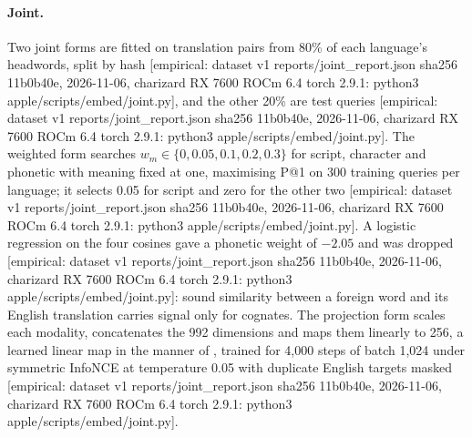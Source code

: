 \documentclass[11pt]{article}
\newcommand{\tg}[1]{\textcolor{bucketgray}{\footnotesize #1}}
\begin{document}
\paragraph{Joint.} Two joint forms are fitted on translation pairs from 80\% of each language's headwords, split by hash \tg{[empirical: dataset v1 reports/joint\_report.json sha256 11b0b40e, 2026-11-06, charizard RX 7600 ROCm 6.4 torch 2.9.1: python3 apple/scripts/embed/joint.py]}, and the other 20\% are test queries \tg{[empirical: dataset v1 reports/joint\_report.json sha256 11b0b40e, 2026-11-06, charizard RX 7600 ROCm 6.4 torch 2.9.1: python3 apple/scripts/embed/joint.py]}. The weighted form searches $w_m\in\{0,0.05,0.1,0.2,0.3\}$ for script, character and phonetic with meaning fixed at one, maximising P@1 on 300 training queries per language; it selects 0.05 for script and zero for the other two \tg{[empirical: dataset v1 reports/joint\_report.json sha256 11b0b40e, 2026-11-06, charizard RX 7600 ROCm 6.4 torch 2.9.1: python3 apple/scripts/embed/joint.py]}. A logistic regression on the four cosines gave a phonetic weight of $-2.05$ and was dropped \tg{[empirical: dataset v1 reports/joint\_report.json sha256 11b0b40e, 2026-11-06, charizard RX 7600 ROCm 6.4 torch 2.9.1: python3 apple/scripts/embed/joint.py]}: sound similarity between a foreign word and its English translation carries signal only for cognates. The projection form scales each modality, concatenates the 992 dimensions and maps them linearly to 256, a learned linear map in the manner of \cite{mikolov2013exploiting}, trained for 4,000 steps of batch 1,024 under symmetric InfoNCE \cite{oord2018cpc} at temperature 0.05 with duplicate English targets masked \tg{[empirical: dataset v1 reports/joint\_report.json sha256 11b0b40e, 2026-11-06, charizard RX 7600 ROCm 6.4 torch 2.9.1: python3 apple/scripts/embed/joint.py]}.
\end{document}
